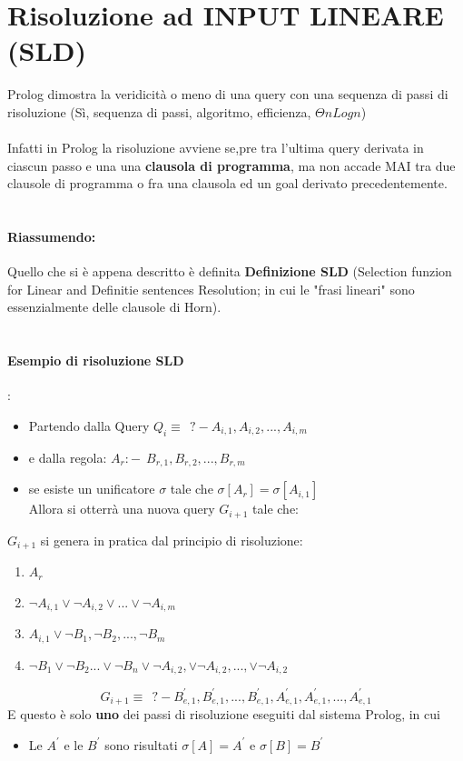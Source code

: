 \documentclass[12pt, a4paper, openany, oneside]{book}
\begin{document}
\section{Risoluzione ad INPUT LINEARE (SLD)}
Prolog dimostra la veridicità o meno di una query con una sequenza di passi di
risoluzione (Sì, sequenza di passi, algoritmo, efficienza, $\Theta nLogn$) 
\\ \\
Infatti in Prolog la risoluzione avviene se,pre tra l'ultima query derivata in 
ciascun passo e una una \textbf{clausola di programma}, ma non accade MAI tra
due clausole di programma o fra una clausola ed un goal derivato precedentemente.
\\ \\
\paragraph{Riassumendo: } Quello che si è appena descritto è definita \textbf{Definizione
SLD} (Selection funzion for Linear and Definitie sentences Resolution; in cui
le "frasi lineari" sono essenzialmente delle clausole di Horn).
\\ \\
\paragraph{Esempio di risoluzione SLD}:
\begin{itemize}
	\item Partendo dalla Query $Q_{i} \equiv ~~ ?- A_{i,1}, A_{i,2}, ..., A_{i,m}$
	\item e dalla regola: $A_{r} :- ~~ B_{r,1}, B_{r,2}, ..., B_{r,m}$
	\item se esiste un unificatore $\sigma$ tale che $\sigma[A_{r}] = 
	\sigma[A_{i,1}]$ \\
	Allora si otterrà una nuova query $G_{i+1}$ tale che: 
\end{itemize}
$G_{i+1}$ si genera in pratica dal principio di risoluzione:
\begin{enumerate}
	\item $A_{r}$
	\item $\neg A_{i,1} \vee \neg A_{i,2}\vee ...\vee \neg A_{i,m}$ 
	\item $A_{i,1} \vee \neg B_{1}, \neg B_{2}, ..., \neg B_{m}$
	\item $\neg B_{1} \vee \neg B_{2} ... \vee \neg B_{n} \vee \neg A_{i,2},
	\vee \neg A_{i,2}, ..., \vee \neg A_{i,2}$
\end{enumerate}
\[G_{i+1} \equiv ~~ ?- B_{e,1}^{'}, B_{e,1}^{'}, ..., B_{e,1}^{'}, A_{e,1}^{'}, 
A_{e,1}^{'}, ..., A_{e,1}^{'} \]
E questo è solo \textbf{uno} dei passi di risoluzione eseguiti dal sistema Prolog,
in cui \begin{itemize}
\item Le $A^{'}$ e le $B^{'}$ sono risultati $\sigma[A] = A^{'}$ e 
$\sigma[B] = B^{'}$
\end{itemize}
\end{document}
